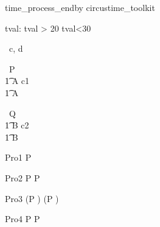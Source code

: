 \begin{zsection}
   \SECTION time\_process\_endby \parents circustime\_toolkit
\end{zsection}


\begin{axdef}
   tval: \nat
\where
   tval > 20 \land tval<30
\end{axdef}



\begin{circus}
   \circchannel\ c, d \\
\end{circus}



\begin{circus}
    \circprocess\ P \circdef  \circbegin  \\
    \t1 A \circdef c1 \then \Skip \\
    \t1 \circspot A \\
    \circend
\end{circus}



\begin{circus}
    \circprocess\ Q \circdef  \circbegin  \\
    \t1 B \circdef c2 \then \Skip \\
    \t1 \circspot B \\
    \circend
\end{circus}


\begin{circus}
    \circprocess Pro1 \circdef P \circendby {} \rcirctime \\
\end{circus}

\begin{circus}
    \circprocess Pro2 \circdef P \circendby {} \rcirctime  \circseq P \circendby {} \rcirctime  \\
\end{circus}
    
\begin{circus}
    \circprocess Pro3 \circdef (P \circendby {} \rcirctime ) \circseq (P \circendby {} \rcirctime ) \\
\end{circus}
    
\begin{circus}
    \circprocess Pro4 \circdef P \circendby {} \rcirctime  \extchoice P \circendby {} \rcirctime  \\ 
\end{circus}
    
